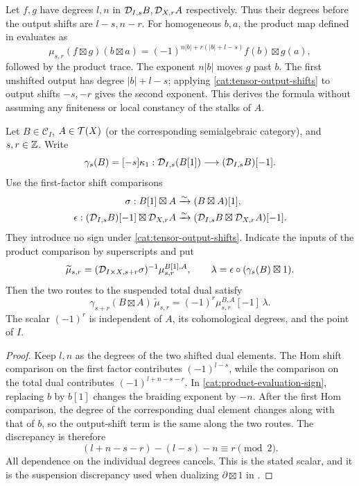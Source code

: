 Let $f,g$ have degrees $l,n$ in $\mathcal D_{I,s}B,\mathcal D_{X,r}A$ respectively.
Thus their degrees before the output shifts are $l-s,n-r$.
For homogeneous $b,a$, the product map defined in
 evaluates as
\begin{equation}
 \label{cat:product-evaluation-sign}
 \mu_{s,r}(f\boxtimes g)(b\boxtimes a)
 =(-1)^{n|b|+r(|b|+l-s)}f(b)\boxtimes g(a),
\end{equation}
followed by the product trace.  The exponent $n|b|$ moves $g$ past
$b$.  The first unshifted output has degree $|b|+l-s$; applying
\eqref{cat:tensor-output-shifts} to output shifts $-s,-r$ gives the
second exponent.  This derives the formula without assuming any
finiteness or local constancy of the stalks of $A$.

\begin{lemma}
\label{cat:product-shift-sign}
Let $B\in\mathcal C_I$, $A\in\mathcal T(X)$ (or the corresponding
semialgebraic category), and $s,r\in\mathbb Z$. Write
\[
 \gamma_s(B)=[-s]\kappa_1:
 \mathcal D_{I,s}(B[1])\longrightarrow(\mathcal D_{I,s}B)[-1].
\]
Use the first-factor shift comparisons
\[
 \begin{aligned}
 \sigma: B[1]\boxtimes A&\xrightarrow{\sim}(B\boxtimes A)[1],\\
 \epsilon: (\mathcal D_{I,s}B)[-1]\boxtimes\mathcal D_{X,r}A
 &\xrightarrow{\sim}(\mathcal D_{I,s}B\boxtimes\mathcal D_{X,r}A)[-1].
 \end{aligned}
\]
They introduce no sign under \eqref{cat:tensor-output-shifts}.
Indicate the inputs of the product comparison by superscripts and put
\[
 \widetilde\mu_{s,r}
   =(\mathcal D_{I\times X,s+r}\sigma)^{-1}\mu_{s,r}^{B[1],A},
 \qquad
 \lambda=\epsilon\circ(\gamma_s(B)\boxtimes1).
\]
Then the two routes to the suspended total dual satisfy
\begin{equation}\label{cat:suspension-comparison}
 \gamma_{s+r}(B\boxtimes A)\,\widetilde\mu_{s,r}
   =(-1)^r\mu_{s,r}^{B,A}[-1]\,\lambda.
\end{equation}
The scalar $(-1)^r$ is independent of $A$, its cohomological degrees,
and the point of $I$.
\end{lemma}

\begin{proof}
Keep $l,n$ as the degrees of the two shifted dual elements.  The Hom
shift comparison on the first factor contributes $(-1)^{l-s}$, while
the comparison on the total dual contributes
$(-1)^{l+n-s-r}$.  In
\eqref{cat:product-evaluation-sign}, replacing $b$ by $b[1]$ changes
the braiding exponent by $-n$.  After the first Hom comparison, the
degree of the corresponding dual element changes along with that of
$b$, so the output-shift term is the same along the two routes.
The discrepancy is therefore
\[
 (l+n-s-r)-(l-s)-n\equiv r\pmod2.
\]
All dependence on the individual degrees cancels.  This is the stated
scalar, and it is the suspension discrepancy used when dualizing
$\partial\boxtimes1$ in .
\end{proof}

